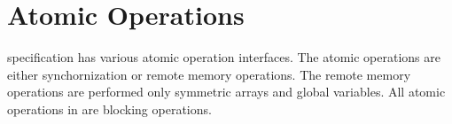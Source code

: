 \section{Atomic Operations}

\openshmem{} specification has various atomic operation interfaces. The atomic 
operations are either synchornization or remote memory operations. The remote memory 
operations are performed only symmetric arrays and global variables. 
All atomic operations in \openshmem{} are blocking operations.


